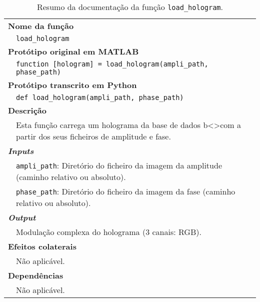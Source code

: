 \begin{table}[!hp]
    \centering
    \caption{Resumo da documentação da função \texttt{load\_hologram}.}
    \label{tab:load_hologram}
    \begin{tabular}{p{1cm} p{10cm}}
        \hline
        \multicolumn{2}{l}{\bfseries Nome da função}\\
         & \verb|load_hologram|\\
        \hline
        \multicolumn{2}{l}{\bfseries Protótipo original em MATLAB}\\
         & \texttt{function [hologram] = load_hologram(ampli_path, phase_path)}\\
        \hline
        \multicolumn{2}{l}{\bfseries Protótipo transcrito em Python}\\
         & \texttt{def load_hologram(ampli_path, phase_path)} \\
        \hline\multicolumn{2}{l}{\bfseries Descrição}\\
         & Esta função carrega um holograma da base de dados b<>com a partir dos seus ficheiros de amplitude e fase.\\
        \hline\multicolumn{2}{l}{\bfseries \textit{Inputs}}\\
         & \verb|ampli_path|: Diretório do ficheiro da imagem da amplitude (caminho relativo ou absoluto).\\
         & \verb|phase_path|: Diretório do ficheiro da imagem da fase (caminho relativo ou absoluto).\\
        \hline\multicolumn{2}{l}{\bfseries \textit{Output}}\\
         & Modulação complexa do holograma (3 canais: \ac{RGB}).\\
        \hline\multicolumn{2}{l}{\bfseries Efeitos colaterais}\\
         & Não aplicável. \\
        \hline\multicolumn{2}{l}{\bfseries Dependências}\\
         & Não aplicável. \\
        \hline
    \end{tabular}
\end{table}



